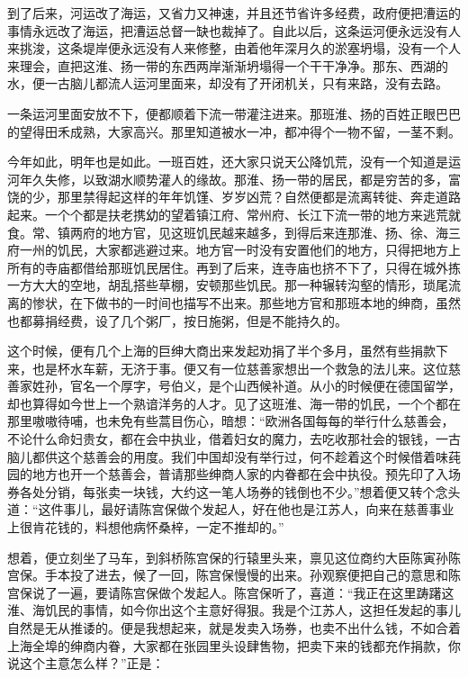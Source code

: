 \documentclass[12pt,UTF8]{ctexbook}
\begin{document}
{{{到了后来，河运改了海运，又省力又神速，并且还节省许多经费，政府便把漕运的事情永远改了海运，把漕运总督一缺也裁掉了。自此以后，这条运河便永远没有人来挑浚，这条堤岸便永远没有人来修整，由着他年深月久的淤塞坍塌，没有一个人来理会，直把这淮、扬一带的东西两岸渐渐坍塌得一个干干净净。那东、西湖的水，便一古脑儿都流人运河里面来，却没有了开闭机关，只有来路，没有去路。

一条运河里面安放不下，便都顺着下流一带灌注进来。那班淮、扬的百姓正眼巴巴的望得田禾成熟，大家高兴。那里知道被水一冲，都冲得个一物不留，一茎不剩。

今年如此，明年也是如此。一班百姓，还大家只说天公降饥荒，没有一个知道是运河年久失修，以致湖水顺势灌人的缘故。那淮、扬一带的居民，都是穷苦的多，富饶的少，那里禁得起这样的年年饥馑、岁岁凶荒？自然便都是流离转徙、奔走道路起来。一个个都是扶老携幼的望着镇江府、常州府、长江下流一带的地方来逃荒就食。常、镇两府的地方官，见这班饥民越来越多，到得后来连那淮、扬、徐、海三府一州的饥民，大家都逃避过来。地方官一时没有安置他们的地方，只得把地方上所有的寺庙都借给那班饥民居住。再到了后来，连寺庙也挤不下了，只得在城外拣一方大大的空地，胡乱搭些草棚，安顿那些饥民。那一种辗转沟壑的情形，琐尾流离的惨状，在下做书的一时间也描写不出来。那些地方官和那班本地的绅商，虽然也都募捐经费，设了几个粥厂，按日施粥，但是不能持久的。

这个时候，便有几个上海的巨绅大商出来发起劝捐了半个多月，虽然有些捐款下来，也是杯水车薪，无济于事。便又有一位慈善家想出一个救急的法儿来。这位慈善家姓孙，官名一个厚字，号伯义，是个山西候补道。从小的时候便在德国留学，却也算得如今世上一个熟谙洋务的人才。见了这班淮、海一带的饥民，一个个都在那里嗷嗷待哺，也未免有些蒿目伤心，暗想：“欧洲各国每每的举行什么慈善会，不论什么命妇贵女，都在会中执业，借着妇女的魔力，去吃收那社会的银钱，一古脑儿都供这个慈善会的用度。我们中国却没有举行过，何不趁着这个时候借着味莼园的地方也开一个慈善会，普请那些绅商人家的内眷都在会中执役。预先印了入场券各处分销，每张卖一块钱，大约这一笔人场券的钱倒也不少。”想着便又转个念头道：“这件事儿，最好请陈宫保做个发起人，好在他也是江苏人，向来在慈善事业上很肯花钱的，料想他病怀桑梓，一定不推却的。”

想着，便立刻坐了马车，到斜桥陈宫保的行辕里头来，禀见这位商约大臣陈寅孙陈宫保。手本投了进去，候了一回，陈宫保慢慢的出来。孙观察便把自己的意思和陈宫保说了一遍，要请陈宫保做个发起人。陈宫保听了，喜道：“我正在这里踌躇这淮、海饥民的事情，如今你出这个主意好得狠。我是个江苏人，这担任发起的事儿自然是无从推诿的。便是我想起来，就是发卖入场券，也卖不出什么钱，不如合着上海全埠的绅商内眷，大家都在张园里头设肆售物，把卖下来的钱都充作捐款，你说这个主意怎么样？”正是：

}}}
\end{document}
